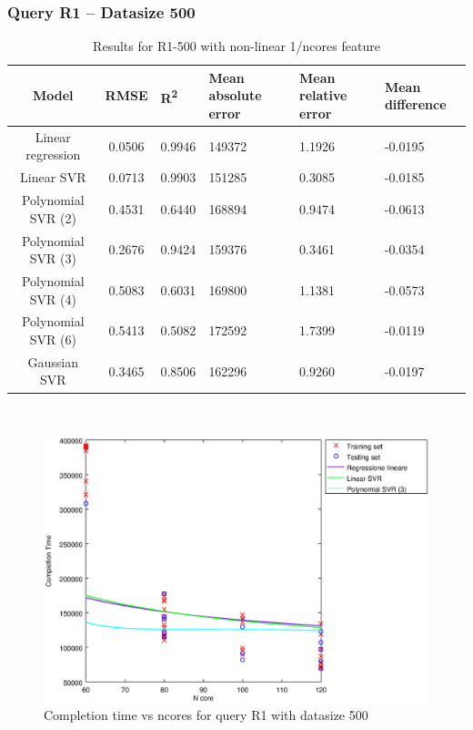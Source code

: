 \documentclass[a4paper,11pt]{article}
\begin{document}
\newpage
\subsubsection{Query R1 -- Datasize 500}
\begin{table}[H]
	\centering
	\begin{adjustbox}{center}
		\begin{tabular}{c | c M{1.2cm} M{2.5cm} M{2.5cm} M{1.8cm}}
			Model & RMSE & R\textsuperscript{2} & Mean absolute error & Mean relative error & Mean difference \tabularnewline
			\hline
			Linear regression & 0.0506 & 0.9946 & 149372 & 1.1926 & -0.0195 \\
			Linear SVR & 0.0713 & 0.9903 & 151285 & 0.3085 & -0.0185 \\
			Polynomial SVR (2) & 0.4531 & 0.6440 & 168894 & 0.9474 & -0.0613 \\
			Polynomial SVR (3) & 0.2676 & 0.9424 & 159376 & 0.3461 & -0.0354 \\
			Polynomial SVR (4) & 0.5083 & 0.6031 & 169800 & 1.1381 & -0.0573 \\
			Polynomial SVR (6) & 0.5413 & 0.5082 & 172592 & 1.7399 & -0.0119 \\
			Gaussian SVR & 0.3465 & 0.8506 & 162296 & 0.9260 & -0.0197 \\
		\end{tabular}
	\end{adjustbox}
	\\
	\caption{Results for R1-500 with non-linear 1/ncores feature}
	\label{table_R1_prediction_all}
\end{table}

\begin {figure}[hbtp]
\centering
\includegraphics[width=\textwidth]{output/R1_500_1_OVER_NCORES/plot_R1_500_bestmodels.eps}
\caption {Completion time vs ncores for query R1 with datasize 500}
\end {figure}
\end{document}
